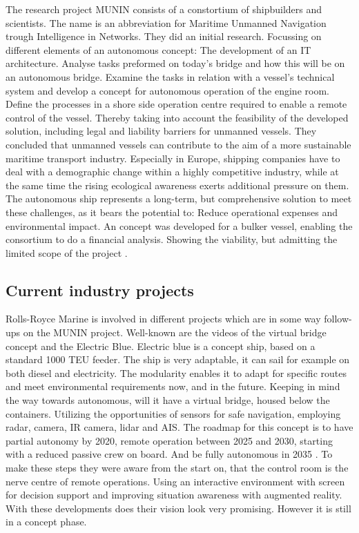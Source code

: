 The research project MUNIN consists of a constortium of shipbuilders and scientists. The name is an abbreviation for Maritime Unmanned Navigation trough Intelligence in Networks. They did an initial research. Focussing on different elements of an autonomous concept: The development of an IT architecture. Analyse tasks preformed on today's bridge and how this will be on an autonomous bridge. Examine the tasks in relation with a vessel’s technical system and develop a concept for autonomous operation of the engine room. Define the processes in a shore side operation centre required to enable a remote control of the vessel. Thereby taking into account the feasibility of the developed solution, including legal and liability barriers for unmanned vessels.
They concluded that unmanned vessels can contribute to the aim of a more sustainable maritime transport industry. Especially in Europe, shipping companies have to deal with a demographic change within a highly competitive industry, while at the same time the rising ecological awareness exerts additional pressure on them. The autonomous ship represents a long-term, but comprehensive solution to meet these challenges, as it bears the potential to: Reduce operational expenses and
environmental impact.
An concept was developed for a bulker vessel, enabling the consortium to do a financial analysis. Showing the viability, but admitting the limited scope of the project \cite{MUNIN2016}.

\subsection{Current industry projects}
Rolls-Royce Marine is involved in different projects which are in some way follow-ups on the MUNIN project. Well-known are the videos of the virtual bridge concept and the Electric Blue. Electric blue is a concept ship, based on a standard 1000 \ac{TEU} feeder. The ship is very adaptable, it can sail for example on both diesel and electricity. The modularity enables it to adapt for specific routes and meet environmental requirements now, and in the future. 
Keeping in mind the way towards autonomous, will it have a virtual bridge, housed below the containers. Utilizing the opportunities of sensors for safe navigation, employing radar, camera, IR camera, lidar and \ac{AIS}. The roadmap for this concept is to have partial autonomy by 2020, remote operation between 2025 and 2030, starting with a reduced passive crew on board. And be fully autonomous in 2035 \cite{Wilson2017}. 
To make these steps they were aware from the start on, that the control room is the nerve centre of remote operations. Using an interactive environment with screen for decision support and improving situation awareness with augmented reality. With these developments does their vision look very promising. However it is still in a concept phase.

